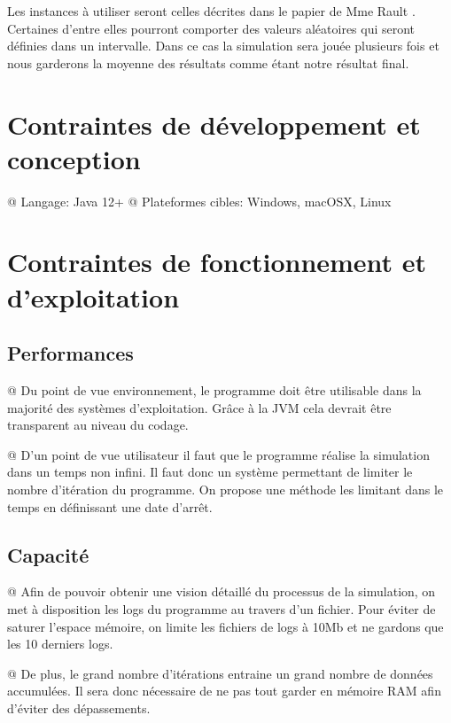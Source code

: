 \documentclass[final]{polytech/polytech}
\begin{document}
		Les instances à utiliser seront celles décrites dans le papier de Mme Rault \cite{Rault:chargers}.
		Certaines d'entre elles pourront comporter des valeurs aléatoires qui seront définies dans un intervalle.
		Dans ce cas la simulation sera jouée plusieurs fois et nous garderons la moyenne des résultats comme étant notre résultat final.

	\section{Contraintes de développement et conception}
		\begin{easylist}[itemize]
			@ Langage: Java 12+
			@ Plateformes cibles: Windows, macOSX, Linux
		\end{easylist}
		
	\section{Contraintes de fonctionnement et d'exploitation}
		\subsection{Performances}
			\begin{easylist}
				@ Du point de vue environnement, le programme doit être utilisable dans la majorité des systèmes d'exploitation.
				Grâce à la JVM cela devrait être transparent au niveau du codage.
			
				@ D'un point de vue utilisateur il faut que le programme réalise la simulation dans un temps non infini.
				Il faut donc un système permettant de limiter le nombre d'itération du programme.
				On propose une méthode les limitant dans le temps en définissant une date d'arrêt.
			\end{easylist}
			
		\subsection{Capacité}
			\begin{easylist}
				@ Afin de pouvoir obtenir une vision détaillé du processus de la simulation, on met à disposition les logs du programme au travers d'un fichier.
				Pour éviter de saturer l'espace mémoire, on limite les fichiers de logs à 10Mb et ne gardons que les 10 derniers logs.
			
				@ De plus, le grand nombre d'itérations entraine un grand nombre de données accumulées.
				Il sera donc nécessaire de ne pas tout garder en mémoire RAM afin d'éviter des dépassements.
			\end{easylist}
\end{document}
